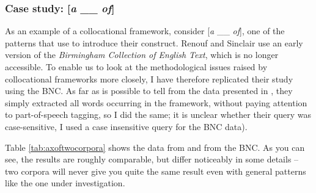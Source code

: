 \subsubsection{Case study: [\textit{a} \_\_ \textit{of}]}
\label{sec:anof}

As an example of a collocational framework, consider [\textit{a} \_\_ \textit{of}], one of the patterns that \citet{renouf_collocational_1991} use to introduce their construct. Renouf and Sinclair use an early version of the \textit{Birmingham Collection of English Text}, which is no longer accessible. To enable us to look at the methodological issues raised by collocational frameworks more closely, I have therefore replicated their study using the BNC. As far as is possible to tell from the data presented in \citet{renouf_collocational_1991}, they simply extracted all words occurring in the framework, without paying attention to part-of-speech tagging, so I did the same; it is unclear whether their query was case-sensitive, I used a case insensitive query for the BNC data).

Table \ref{tab:axoftwocorpora} shows the data from \citet{renouf_collocational_1991} and from the BNC. As you can see, the results are roughly comparable, but differ noticeably in some details -- two corpora will never give you quite the same result even with general patterns like the one under investigation.

